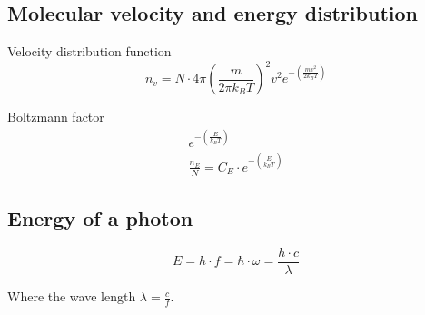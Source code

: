\subsection{Molecular velocity and energy distribution}
Velocity distribution function
\begin{equation}
	n_v = N \cdot 4 \pi \left(\frac{m}{2\pi k_B T}\right)^2 v^2 e^{-\left(\frac{m v^2}{2 k_B T}\right)}
\end{equation}

Boltzmann factor
\begin{align}
	e^{-\left(\frac{E}{k_B T}\right)} \\
	\frac{n_E}{N} = C_E \cdot e^{-\left(\frac{E}{k_B T}\right)}
\end{align}

\subsection{Energy of a photon}

\begin{equation}
	E = h \cdot f = \hbar \cdot \omega = \frac{h \cdot c}{\lambda}
\end{equation}

Where the wave length $\lambda = \frac{c}{f}$. 